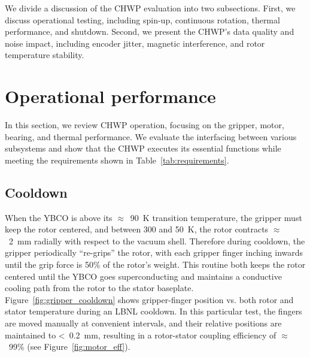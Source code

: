 We divide a discussion of the CHWP evaluation into two subsections. First, we discuss operational testing, including spin-up, continuous rotation, thermal performance, and shutdown. Second, we present the CHWP's data quality and noise impact, including encoder jitter, magnetic interference, and rotor temperature stability.


\section{Operational performance}
\label{sec:pb2b_chwp_operational_performance}

In this section, we review CHWP operation, focusing on the gripper, motor, bearing, and thermal performance. We evaluate the interfacing between various subsystems and show that the CHWP executes its essential functions while meeting the requirements shown in Table~\ref{tab:requirements}.


\subsection{Cooldown}
\label{sec:pb2a_chwp_evaluation_cooldown}

When the YBCO is above its $\approx$~90~K transition temperature, the gripper must keep the rotor centered, and between 300 and 50~K, the rotor contracts $\approx$~2~mm radially with respect to the vacuum shell. Therefore during cooldown, the gripper periodically ``re-grips'' the rotor, with each gripper finger inching inwards until the grip force is 50\% of the rotor's weight. This routine both keeps the rotor centered until the YBCO goes superconducting and maintains a conductive cooling path from the rotor to the stator baseplate. Figure~\ref{fig:gripper_cooldown} shows gripper-finger position vs. both rotor and stator temperature during an LBNL cooldown. In this particular test, the fingers are moved manually at convenient intervals, and their relative positions are maintained to <~0.2~mm, resulting in a rotor-stator coupling efficiency of $\approx$~99\% (see Figure~\ref{fig:motor_eff}). 

